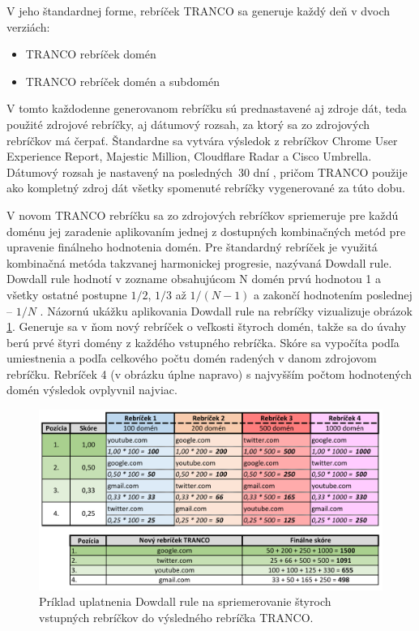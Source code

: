 V jeho štandardnej forme, rebríček TRANCO sa generuje každý deň v dvoch verziách:
\begin{itemize}
    \item TRANCO rebríček domén
    \item TRANCO rebríček domén a subdomén
\end{itemize}

V tomto každodenne generovanom rebríčku sú prednastavené aj zdroje dát, teda použité zdrojové rebríčky, aj dátumový rozsah, za ktorý sa zo zdrojových rebríčkov má čerpať.
Štandardne sa vytvára výsledok z rebríčkov Chrome User Experience Report, Majestic Million, Cloudflare Radar a Cisco Umbrella.
Dátumový rozsah je nastavený na \mbox{posledných 30} dní \cite{tranco-config}, pričom TRANCO použije ako kompletný zdroj dát všetky spomenuté rebríčky vygenerované za túto dobu. 

V novom TRANCO rebríčku sa zo zdrojových rebríčkov spriemeruje pre každú doménu jej zaradenie aplikovaním jednej z dostupných kombinačných metód pre upravenie finálneho hodnotenia domén.
Pre štandardný rebríček je využitá kombinačná metóda takzvanej harmonickej progresie, nazývaná Dowdall rule. 
Dowdall rule hodnotí v zozname obsahujúcom N domén prvú hodnotou 1 a všetky ostatné postupne \(1/2\), \(1/3\) až \(1/(N-1)\) a zakončí hodnotením poslednej -- \(1/N\) \cite{tranco, tranco-config}.
Názornú ukážku aplikovania Dowdall rule na rebríčky vizualizuje obrázok \ref{img:dowdall-rule}.
Generuje sa v ňom nový rebríček o veľkosti štyroch domén, takže sa do úvahy berú prvé štyri domény z každého vstupného rebríčka. 
Skóre sa vypočíta podľa umiestnenia a podľa celkového počtu domén radených v danom zdrojovom rebríčku. 
Rebríček 4 (v obrázku úplne napravo) s najvyšším počtom hodnotených domén výsledok ovplyvnil najviac.

\begin{figure}[htb]
\begin{center}
 \includegraphics[scale=0.84]{obrazky-figures/dowdall_rule_size_fit_cropped.pdf}
 \caption{Príklad uplatnenia Dowdall rule na spriemerovanie štyroch vstupných rebríčkov do výsledného rebríčka TRANCO.}
 \label{img:dowdall-rule}
\end{center}
\end{figure}

